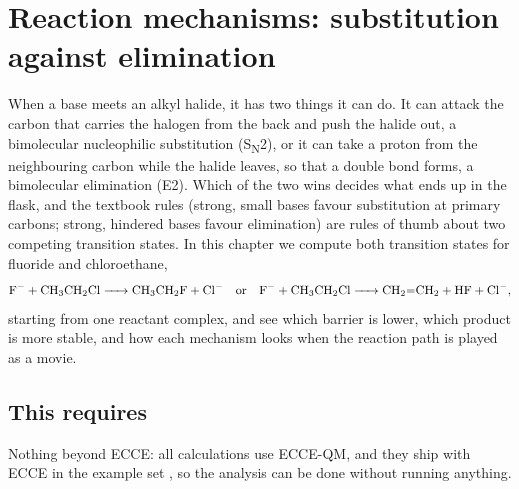 \chapter{Reaction mechanisms: substitution against elimination}
\label{ch:mechanisms}

When a base meets an alkyl halide, it has two things it can do. It can attack the carbon that carries the halogen from the back and push the halide out, a bimolecular nucleophilic substitution (S\textsubscript{N}2), or it can take a proton from the neighbouring carbon while the halide leaves, so that a double bond forms, a bimolecular elimination (E2). Which of the two wins decides what ends up in the flask, and the textbook rules (strong, small bases favour substitution at primary carbons; strong, hindered bases favour elimination) are rules of thumb about two competing transition states. In this chapter we compute both transition states for fluoride and chloroethane,
\begin{equation*}
	\ce{F- + CH3CH2Cl -> CH3CH2F + Cl-} \quad\text{or}\quad \ce{F- + CH3CH2Cl -> CH2=CH2 + HF + Cl-},
\end{equation*}
starting from one reactant complex, and see which barrier is lower, which product is more stable, and how each mechanism looks when the reaction path is played as a movie.

\section*{This requires}
Nothing beyond ECCE: all calculations use ECCE-QM, and they ship with ECCE in the example set , so the analysis can be done without running anything.

